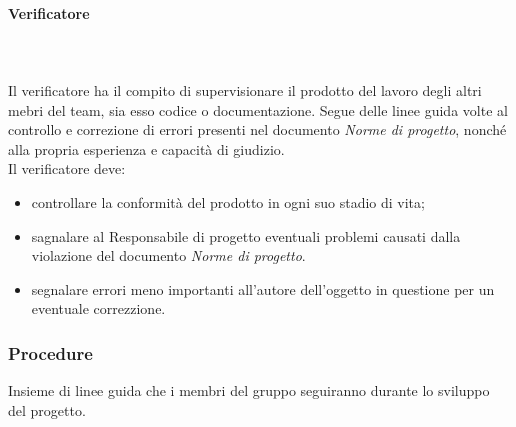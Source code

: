 			\paragraph{Verificatore} \mbox{}\\ \mbox{}\\
			Il verificatore ha il compito di supervisionare il prodotto del lavoro degli altri mebri del team, sia esso codice o documentazione. Segue delle linee guida volte al controllo e correzione di errori presenti nel documento \textit{Norme di progetto}, nonché alla propria esperienza e capacità di giudizio.\\
			Il verificatore deve:
			\begin{itemize}
				\item controllare la conformità del prodotto in ogni suo stadio di vita;
				\item sagnalare al Responsabile di progetto eventuali problemi causati dalla violazione del documento \textit{Norme di progetto}.
				\item segnalare errori meno importanti all'autore dell'oggetto in questione per un eventuale correzzione.
			\end{itemize}
		\subsubsection{Procedure}
		Insieme di linee guida che i membri del gruppo seguiranno durante lo sviluppo del progetto.
